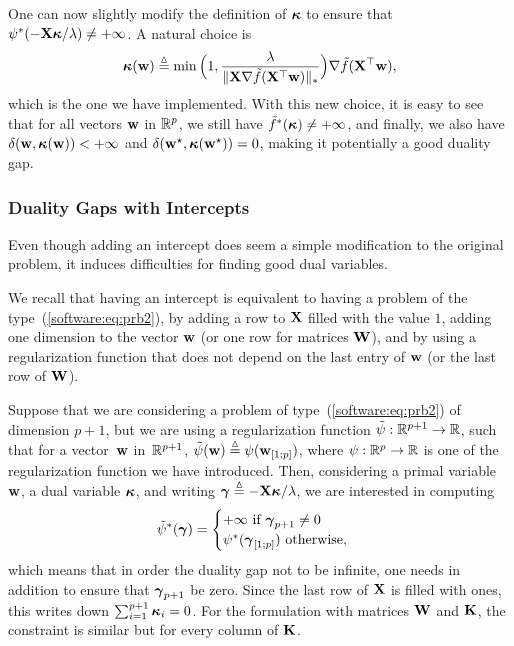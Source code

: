 \documentclass[a4paper, 11pt]{article}
\begin{document}
   One can now slightly modify the definition of ${\boldsymbol\kappa}$
   to ensure that $\psi^\ast(-{\mathbf X}{\boldsymbol\kappa}/\lambda) \neq
   +\infty$. A natural choice is
   \begin{displaymath}
   {\boldsymbol\kappa}({\mathbf w}) \stackrel{\vartriangle}{=}
   \min\Big(1,\frac{\lambda}{\|{\mathbf X}\nabla\tilde{f}({\mathbf X}^\top{\mathbf w})\|_\ast}\Big)\nabla
   \tilde{f}({\mathbf X}^\top{\mathbf w}),
   \end{displaymath}
   which is the one we have implemented.  With this new choice, it is easy to see
   that for all vectors ${\mathbf w}$ in ${\mathbb R}^p$, we still have $\tilde{f}^\ast({\boldsymbol\kappa}) \neq + \infty$, and
   finally, we also have $\delta({\mathbf w},{\boldsymbol\kappa}({\mathbf w})) < + \infty$ and
   $\delta({\mathbf w}^\star,{\boldsymbol\kappa}({\mathbf w}^\star))=0$, making it potentially a good
   duality gap.

   \subsubsection{Duality Gaps with Intercepts}
   Even though adding an intercept does seem a simple modification to the original
   problem, it induces difficulties for finding good dual variables.

   We recall that having an intercept is equivalent to having a problem of the
   type~(\ref{software:eq:prb2}), by adding a row to ${\mathbf X}$ filled with the value
   $1$, adding one dimension to the vector ${\mathbf w}$ (or one row for matrices ${\mathbf W}$),
   and by using a regularization function that does not depend on the last entry
   of ${\mathbf w}$ (or the last row of ${\mathbf W}$).

   Suppose that we are considering a problem of
   type~(\ref{software:eq:prb2}) of dimension $p+1$, but we are using a
   regularization function $\tilde{\psi}: {\mathbb R}^{p+1} \to {\mathbb R}$, such that for a
   vector~${\mathbf w}$ in~${\mathbb R}^{p+1}$, $\tilde{\psi}({\mathbf w}) \stackrel{\vartriangle}{=} \psi({\mathbf w}_{[ 1;p ]})$,
   where $\psi: {\mathbb R}^p \to {\mathbb R}$ is one of the regularization function we have
   introduced. Then, considering a primal variable ${\mathbf w}$, a dual variable ${\boldsymbol\kappa}$,
   and writing ${\boldsymbol\gamma}\stackrel{\vartriangle}{=}-{\mathbf X}{\boldsymbol\kappa}/\lambda$, we are interested in computing
   \begin{displaymath}
   \tilde{\psi}^\ast({\boldsymbol\gamma}) = \begin{cases}
   +\infty ~\text{if}~ {\boldsymbol\gamma}_{p+1} \neq 0 \\
      \psi^\ast({\boldsymbol\gamma}_{[ 1;p ]}) ~\text{otherwise},
   \end{cases}
   \end{displaymath}
   which means that in order the duality gap not to be infinite, one needs in addition to ensure
   that ${\boldsymbol\gamma}_{p+1}$ be zero. Since the last row of ${\mathbf X}$ is filled with ones, this writes
   down $\sum_{i=1}^{p+1} {\boldsymbol\kappa}_{i}=0$.
   For the formulation with matrices ${\mathbf W}$ and ${\mathbf K}$, the constraint is similar but for every
   column of ${\mathbf K}$.
\end{document}
